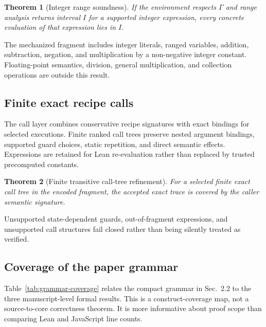 \documentclass[10pt]{article}
\theoremstyle{plain}
\newtheorem{theorem}{Theorem}
\theoremstyle{remark}
\begin{document}
\begin{theorem}[Integer range soundness]
\label{thm:range}
If the environment respects $\Gamma$ and range analysis returns interval $I$ for a supported integer expression, every concrete evaluation of that expression lies in $I$.
\end{theorem}

The mechanized fragment includes integer literals, ranged variables, addition, subtraction, negation, and multiplication by a non-negative integer constant. Floating-point semantics, division, general multiplication, and collection operations are outside this result.

\subsection{Finite exact recipe calls}
The call layer combines conservative recipe signatures with exact bindings for selected executions. Finite ranked call trees preserve nested argument bindings, supported guard choices, static repetition, and direct semantic effects. Expressions are retained for Lean re-evaluation rather than replaced by trusted precomputed constants.

\begin{theorem}[Finite transitive call-tree refinement]
\label{thm:calltree}
For a selected finite exact call tree in the encoded fragment, the accepted exact trace is covered by the caller semantic signature.
\end{theorem}

Unsupported state-dependent guards, out-of-fragment expressions, and unsupported call structures fail closed rather than being silently treated as verified.

\subsection{Coverage of the paper grammar}
Table~\ref{tab:grammar-coverage} relates the compact grammar in Sec.~2.2 to the three manuscript-level formal results. This is a construct-coverage map, not a source-to-core correctness theorem. It is more informative about proof scope than comparing Lean and JavaScript line counts.
\end{document}
